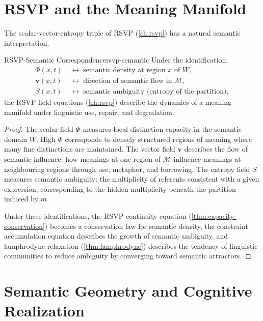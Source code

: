 \documentclass[12pt,twoside,openright]{book}
\begin{document}
\section{RSVP and the Meaning Manifold}

The scalar-vector-entropy triple of RSVP
(\cref{ch:rsvp}) has a natural semantic interpretation.

\begin{proposition}{RSVP-Semantic Correspondence}{rsvp-semantic}
  Under the identification:
  \begin{align*}
    \Phi(x,t) &\;\leftrightarrow\;
    \text{semantic density at region }x\text{ of }W, \\
    \mathbf{v}(x,t) &\;\leftrightarrow\;
    \text{direction of semantic flow in }\mathcal{M}, \\
    S(x,t) &\;\leftrightarrow\;
    \text{semantic ambiguity (entropy of the partition)},
  \end{align*}
  the RSVP field equations (\cref{ch:rsvp}) describe
  the dynamics of a meaning manifold under linguistic
  use, repair, and degradation.
\end{proposition}

\begin{proof}
  The scalar field $\Phi$ measures local distinction
  capacity in the semantic domain $W$.
  High $\Phi$ corresponds to densely structured
  regions of meaning where many fine distinctions are
  maintained.
  The vector field $\mathbf{v}$ describes the
  flow of semantic influence: how meanings at one
  region of $\mathcal{M}$ influence meanings at
  neighbouring regions through use, metaphor, and
  borrowing.
  The entropy field $S$ measures semantic ambiguity:
  the multiplicity of referents consistent with a
  given expression, corresponding to the hidden
  multiplicity beneath the partition induced by $m$.

  Under these identifications, the RSVP continuity
  equation (\cref{thm:capacity-conservation}) becomes
  a conservation law for semantic density, the
  constraint accumulation equation describes the
  growth of semantic ambiguity, and lamphrodyne
  relaxation (\cref{thm:lamphrodyne}) describes
  the tendency of linguistic communities to reduce
  ambiguity by converging toward semantic attractors.
\end{proof}

\section{Semantic Geometry and Cognitive Realization}
\end{document}
